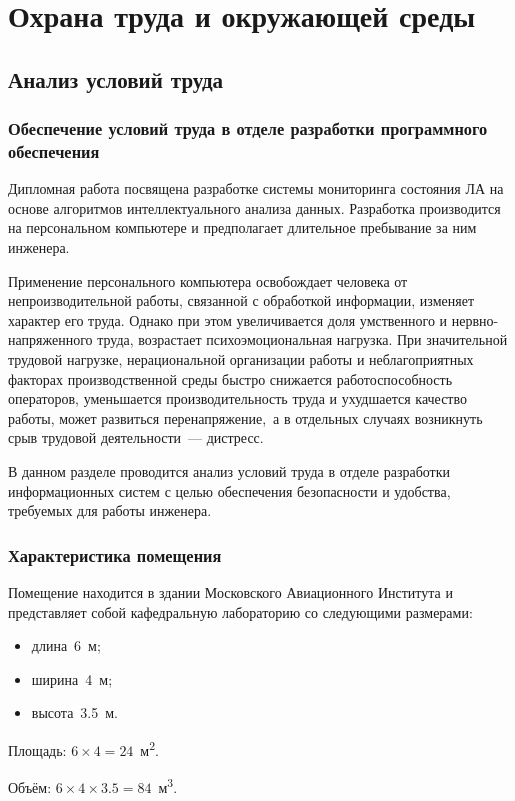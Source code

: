 \chapter{Охрана труда и окружающей среды}
\section{Анализ условий труда}
\subsection{Обеспечение условий труда в отделе разработки программного обеспечения}
Дипломная работа посвящена разработке системы мониторинга состояния ЛА на основе алгоритмов интеллектуального анализа данных. Разработка производится на персональном компьютере и предполагает длительное пребывание за ним инженера.

Применение персонального компьютера освобождает человека от непроизводительной работы, связанной с обработкой информации, изменяет характер его труда. Однако при этом увеличивается доля умственного и нервно-напряженного труда, возрастает психоэмоциональная нагрузка. При значительной трудовой нагрузке, нерациональной организации работы и неблагоприятных факторах производственной среды быстро снижается работоспособность операторов, уменьшается производительность труда и ухудшается качество работы, может развиться перенапряжение,~а в отдельных случаях возникнуть срыв трудовой деятельности~--- дистресс.

В данном разделе проводится анализ условий труда в отделе разработки информационных систем с целью обеспечения безопасности и удобства, требуемых для работы инженера.

\subsection{Характеристика помещения}
Помещение находится в здании Московского Авиационного Института и представляет собой кафедральную лабораторию со следующими размерами:
\begin{itemize}
	\item длина~6~м;
	\item ширина~4~м;
	\item высота~3.5~м.
\end{itemize}

Площадь: $6\times4 = 24$~м\textsuperscript{2}.

Объём: $6\times4\times3.5 = 84$~м\textsuperscript{3}.

